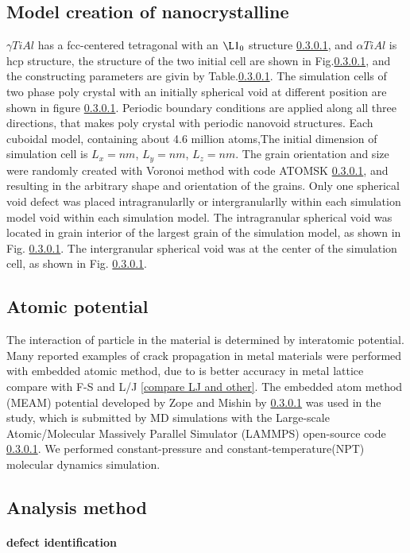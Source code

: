 \documentclass[final,5p,times,twocolumn]{elsarticle}
\begin{document}
\subsection{Model creation of nanocrystalline}
$\gamma  TiAl$ has a fcc-centered tetragonal with an $\L1_0$ structure \ref{}, and $\alpha TiAl$ is hcp structure, the structure of the two initial cell are shown in Fig.\ref{}, and the constructing parameters are givin by Table.\ref{}. The simulation cells of two phase poly crystal with an initially spherical void at different position are shown in figure \ref{}. Periodic boundary conditions are applied along all three directions, that makes poly crystal with periodic nanovoid structures. Each cuboidal model, containing about 4.6 million atoms,The initial dimension of simulation cell is  $L_x = nm$, $L_y =  nm$, $L_z =  nm$. The grain orientation and size were randomly created with Voronoi method with code ATOMSK \ref{}, and resulting in the arbitrary shape and orientation of the grains. Only one spherical void defect was placed intragranularlly or intergranularlly within each simulation model void within each simulation model. The intragranular spherical void was located in grain interior of the largest grain of the simulation model, as shown in Fig. \ref{}. The intergranular spherical void was at the center of the simulation cell, as shown in Fig. \ref{}.
\subsection{Atomic potential}
The interaction of particle in the material is determined by interatomic potential. Many reported examples of crack propagation in metal materials were performed with embedded atomic method, due to is better accuracy in metal lattice compare with F-S and L/J \ref{compare LJ and other}. The embedded atom method (MEAM) potential developed by Zope and Mishin by \ref{} was used in the study, which is submitted by MD simulations with the Large-scale Atomic/Molecular Massively Parallel Simulator (LAMMPS) open-source code \ref{}. We performed constant-pressure and constant-temperature(NPT) molecular dynamics simulation.
\subsection{Analysis method}
\paragraph{defect identification}
\end{document}
